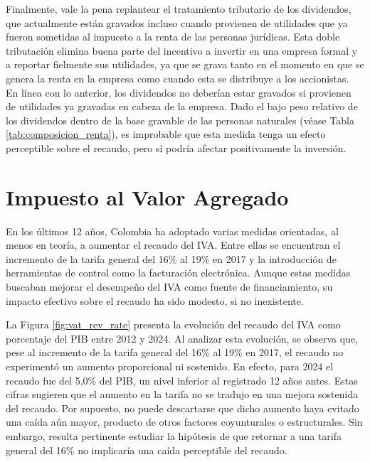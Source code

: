 Finalmente, vale la pena replantear el tratamiento tributario de los dividendos, que actualmente están gravados incluso cuando provienen de utilidades que ya fueron sometidas al impuesto a la renta de las personas jurídicas. Esta doble tributación elimina buena parte del incentivo a invertir en una empresa formal y a reportar fielmente sus utilidades, ya que se grava tanto en el momento en que se genera la renta en la empresa como cuando esta se distribuye a los accionistas. En línea con lo anterior, los dividendos no deberían estar gravados si provienen de utilidades ya gravadas en cabeza de la empresa. Dado el bajo peso relativo de los dividendos dentro de la base gravable de las personas naturales (véase Tabla \ref{tab:composicion_renta}), es improbable que esta medida tenga un efecto perceptible sobre el recaudo, pero sí podría afectar positivamente la inversión.

\section{Impuesto al Valor Agregado}

En los últimos 12 años, Colombia ha adoptado varias medidas orientadas, al menos en teoría, a aumentar el recaudo del IVA. Entre ellas se encuentran el incremento de la tarifa general del 16\% al 19\% en 2017 y la introducción de herramientas de control como la facturación electrónica. Aunque estas medidas buscaban mejorar el desempeño del IVA como fuente de financiamiento, su impacto efectivo sobre el recaudo ha sido modesto, si no inexistente.



La Figura \ref{fig:vat_rev_rate} presenta la evolución del recaudo del IVA como porcentaje del PIB entre 2012 y 2024. Al analizar esta evolución, se observa que, pese al incremento de la tarifa general del 16\% al 19\% en 2017, el recaudo no experimentó un aumento proporcional ni sostenido. En efecto, para 2024 el recaudo fue del 5,0\% del PIB, un nivel inferior al registrado 12 años antes. Estas cifras sugieren que el aumento en la tarifa no se tradujo en una mejora sostenida del recaudo. Por supuesto, no puede descartarse que dicho aumento haya evitado una caída aún mayor, producto de otros factores coyunturales o estructurales. Sin embargo, resulta pertinente estudiar la hipótesis de que retornar a una tarifa general del 16\% no implicaría una caída perceptible del recaudo.


